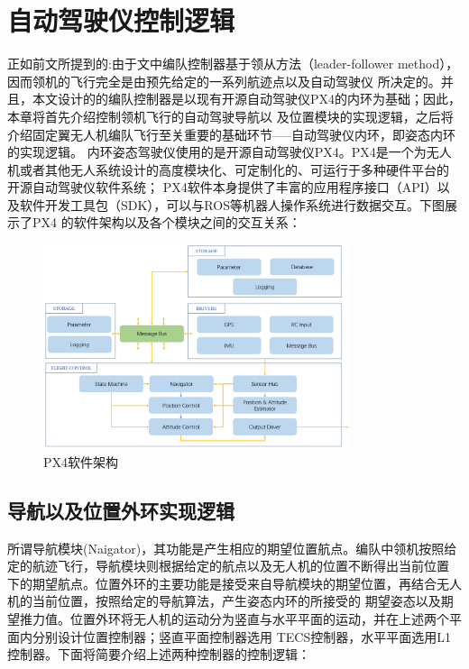 %
%
%
%

\chapter{自动驾驶仪控制逻辑}
\label{chap:single_control_logic}
正如前文所提到的:由于文中编队控制器基于领从方法（leader-follower method），因而领机的飞行完全是由预先给定的一系列航迹点以及自动驾驶仪
所决定的。并且，本文设计的的编队控制器是以现有开源自动驾驶仪PX4的内环为基础；因此，本章将首先介绍控制领机飞行的自动驾驶导航以
及位置模块的实现逻辑，之后将介绍固定翼无人机编队飞行至关重要的基础环节-----自动驾驶仪内环，即姿态内环的实现逻辑。
内环姿态驾驶仪使用的是开源自动驾驶仪PX4。PX4是一个为无人机或者其他无人系统设计的高度模块化、可定制化的、可运行于多种硬件平台的
开源自动驾驶仪软件系统；
PX4软件本身提供了丰富的应用程序接口（API）以及软件开发工具包（SDK），可以与ROS等机器人操作系统进行数据交互。下图展示了PX4
的软件架构以及各个模块之间的交互关系：
\begin{figure}[H]
    \centering
    \includegraphics[width=0.8\textwidth]{figures/c4/PX4_archticher.png}
    \caption{PX4软件架构}\label{fig:PX4_archticher.png}
\end{figure}
\section{导航以及位置外环实现逻辑}
所谓导航模块(Naigator)，其功能是产生相应的期望位置航点。编队中领机按照给定的航迹飞行，导航模块则根据给定的航点以及无人机的位置不断得出当前位置
下的期望航点。位置外环的主要功能是接受来自导航模块的期望位置，再结合无人机的当前位置，按照给定的导航算法，产生姿态内环的所接受的
期望姿态以及期望推力值。位置外环将无人机的运动分为竖直与水平平面的运动，并在上述两个平面内分别设计位置控制器；竖直平面控制器选用
TECS控制器，水平平面选用L1控制器。下面将简要介绍上述两种控制器的控制逻辑：
